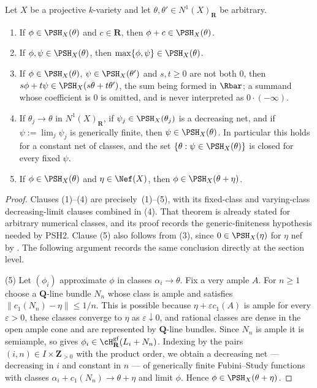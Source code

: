 \begin{lemma}
\label{lem:ch39-closure-any-class}
Let $X$ be a projective $k$-variety and let
$\theta,\theta'\in N^1(X)_{\mathbf R}$ be arbitrary.
\begin{enumerate}
\item If $\phi\in\PSH_X(\theta)$ and $c\in\mathbf R$, then
 $\phi+c\in\PSH_X(\theta)$.
\item If $\phi,\psi\in\PSH_X(\theta)$, then
 $\max\{\phi,\psi\}\in\PSH_X(\theta)$.
\item If $\phi\in\PSH_X(\theta)$, $\psi\in\PSH_X(\theta')$ and
 $s,t\ge0$ are not both $0$, then
  $s\phi+t\psi\in\PSH_X(s\theta+t\theta')$, the sum being formed in
 $\Rbar$; a summand whose coefficient is $0$ is omitted, and is never
 interpreted as $0\cdot(-\infty)$.
\item If $\theta_j\to\theta$ in $N^1(X)_{\mathbf R}$, if
 $\psi_j\in\PSH_X(\theta_j)$ is a decreasing net, and if
 $\psi:=\lim_j\psi_j$ is generically finite, then
 $\psi\in\PSH_X(\theta)$.  In particular this holds for a constant net of
 classes, and the set $\{\theta:\psi\in\PSH_X(\theta)\}$ is closed for
 every fixed $\psi$.
\item If $\phi\in\PSH_X(\theta)$ and $\eta\in\Nef(X)$, then
 $\phi\in\PSH_X(\theta+\eta)$.
\end{enumerate}
\end{lemma}

\begin{proof}
Clauses (1)--(4) are precisely
\,(1)--(5), with its fixed-class and
varying-class decreasing-limit clauses combined in (4).  That theorem is
already stated for arbitrary numerical classes, and its proof records the
generic-finiteness hypothesis needed by PSH2.  Clause (5) also follows
from (3), since $0\in\PSH_X(\eta)$ for $\eta$ nef by
.  The following argument records the same
conclusion directly at the section level.

(5)  Let $(\phi_i)$ approximate $\phi$ in classes $\alpha_i\to\theta$.
Fix a very ample $A$.  For $n\ge1$ choose a
$\mathbf Q$-line bundle $N_n$ whose class is ample and satisfies
$\|c_1(N_n)-\eta\|\le1/n$.  This is possible because
$\eta+\varepsilon c_1(A)$ is ample for every $\varepsilon>0$, these classes
converge to $\eta$ as $\varepsilon\downarrow0$, and rational classes are
dense in the open ample cone and are represented by $\mathbf Q$-line
bundles.
Since $N_n$ is ample it is semiample, so
 gives
$\phi_i\in\cH^{\mathrm{gf}}_{\mathbf R}(L_i+N_n)$.  Indexing by the pairs
$(i,n)\in I\times\mathbf Z_{>0}$ with the product order, we obtain a
decreasing net --- decreasing in $i$ and constant in $n$ --- of
generically finite Fubini--Study functions with classes
$\alpha_i+c_1(N_n)\to\theta+\eta$ and limit $\phi$.  Hence
$\phi\in\PSH_X(\theta+\eta)$.
\end{proof}


